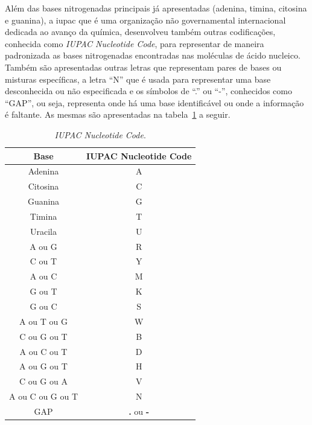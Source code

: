 Além das bases nitrogenadas principais já apresentadas (\gls{adenina}, \gls{timina}, \gls{citosina} e \gls{guanina}), a \gls{iupac} que é uma organização não governamental internacional dedicada ao avanço da química, desenvolveu também outras codificações, conhecida como \textit{IUPAC Nucleotide Code}, para representar de maneira padronizada as bases nitrogenadas encontradas nas moléculas de ácido nucleico. Também são apresentadas outras letras que representam pares de bases ou misturas específicas, a letra ``N'' que é usada para representar uma base desconhecida ou não especificada e os símbolos de ``.'' ou ``-'', conhecidos como ``GAP'', ou seja, representa onde há uma base identificável ou onde a informação é faltante. As mesmas são apresentadas na tabela~\ref{tab:iupacNucleotideCode} a seguir.

\begin{table}[htb]
  \caption{\textit{IUPAC Nucleotide Code}.}
  \begin{center}
    \begin{tabular}{c|c}
      \hline
      Base             & IUPAC Nucleotide Code    \\
      \hline
      Adenina          & A                        \\
      Citosina         & C                        \\
      Guanina          & G                        \\
      Timina           & T                        \\
      Uracila          & U                        \\
      A ou G           & R                        \\
      C ou T           & Y                        \\
      A ou C           & M                        \\
      G ou T           & K                        \\
      G ou C           & S                        \\
      A ou T ou G      & W                        \\
      C ou G ou T      & B                        \\
      A ou C ou T      & D                        \\
      A ou G ou T      & H                        \\
      C ou G ou A      & V                        \\
      A ou C ou G ou T & N                        \\
      GAP              & \textbf{.} ou \textbf{-} \\
      \hline
    \end{tabular}
  \end{center}
  \label{tab:iupacNucleotideCode}
\end{table}

